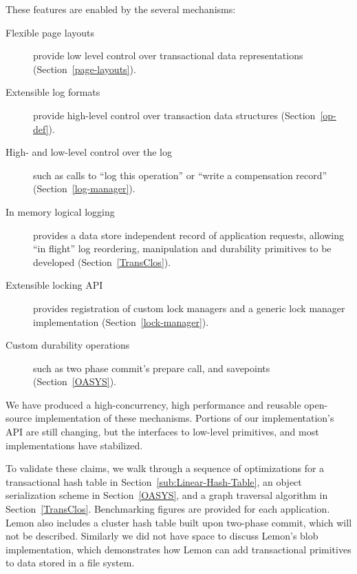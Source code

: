 \documentclass[10pt,letterpaper,twocolumn,english]{article}
\newcommand{\yad}{Lemon\xspace}
\begin{document}
These features are enabled by the several mechanisms:
\begin{description}
\item[Flexible page layouts] provide low level control over 
      transactional data representations (Section~\ref{page-layouts}).
\item[Extensible log formats] provide high-level control over
      transaction data structures (Section~\ref{op-def}).
\item [High- and low-level control over the log] such as calls to ``log this
      operation'' or ``write a compensation record'' (Section~\ref{log-manager}).
\item [In memory logical logging] provides a data store independent
      record of application requests, allowing ``in flight'' log
      reordering, manipulation and durability primitives to be
      developed (Section~\ref{TransClos}).
\item[Extensible locking API] provides registration of custom lock managers
      and a generic lock manager implementation (Section~\ref{lock-manager}).
\item[Custom durability operations] such as two phase commit's
      prepare call, and savepoints (Section~\ref{OASYS}).
\end{description}

We have produced a high-concurrency, high performance and reusable
open-source implementation of these mechanisms.  Portions of our
implementation's API are still changing, but the interfaces to low-level primitives, and most implementations have stabilized.  

To validate these claims, we walk
through a sequence of optimizations for a transactional hash
table in Section~\ref{sub:Linear-Hash-Table}, an object serialization 
scheme in Section~\ref{OASYS}, and a graph traversal algorithm in 
Section~\ref{TransClos}.  Benchmarking figures are provided for each 
application.  \yad also includes a cluster hash table 
built upon two-phase commit, which will not be described.  Similarly we did not have space to discuss \yad's 
blob implementation, which demonstrates how \yad can
add transactional primitives to data stored in a file system.

\end{document}
